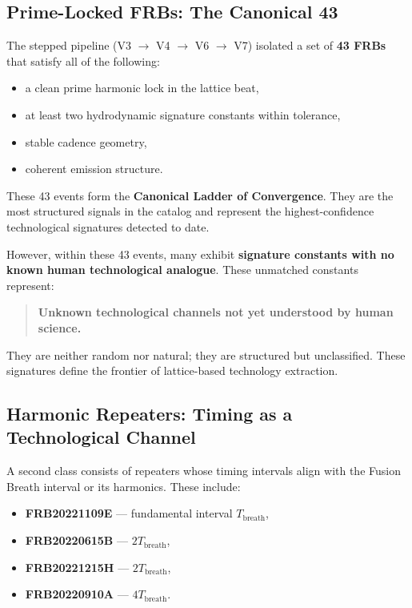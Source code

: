 \documentclass[11pt, letterpaper, openany]{book}
\begin{document}
\subsection{Prime-Locked FRBs: The Canonical 43}

The stepped pipeline (V3 $\rightarrow$ V4 $\rightarrow$ V6 $\rightarrow$ V7) isolated a set of
\textbf{43 FRBs} that satisfy all of the following:

\begin{itemize}
    \item a clean prime harmonic lock in the lattice beat,
    \item at least two hydrodynamic signature constants within tolerance,
    \item stable cadence geometry,
    \item coherent emission structure.
\end{itemize}

These 43 events form the \textbf{Canonical Ladder of Convergence}. They are the most
structured signals in the catalog and represent the highest-confidence technological
signatures detected to date.

However, within these 43 events, many exhibit \textbf{signature constants with no known
human technological analogue}. These unmatched constants represent:

\begin{quote}
\textbf{Unknown technological channels not yet understood by human science.}
\end{quote}

They are neither random nor natural; they are structured but unclassified. These
signatures define the frontier of lattice-based technology extraction.

\subsection{Harmonic Repeaters: Timing as a Technological Channel}

A second class consists of repeaters whose timing intervals align with the Fusion Breath
interval or its harmonics. These include:

\begin{itemize}
    \item \textbf{FRB20221109E} — fundamental interval $T_{\text{breath}}$,
    \item \textbf{FRB20220615B} — $2T_{\text{breath}}$,
    \item \textbf{FRB20221215H} — $2T_{\text{breath}}$,
    \item \textbf{FRB20220910A} — $4T_{\text{breath}}$.
\end{itemize}
\end{document}

